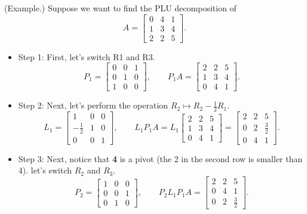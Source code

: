 \documentclass[letterpaper]{article}
\newcommand{\0}{\mathbf{0}}
\begin{document}
\begin{mdframed}
    (Example.) Suppose we want to find the PLU decomposition of 
    \[A = \begin{bmatrix}
        0 & 4 & 1 \\ 
        1 & 3 & 4 \\ 
        2 & 2 & 5
    \end{bmatrix}.\]

    \begin{itemize}
        \item Step 1: First, let's switch R1 and R3. 
        \[P_1 = \begin{bmatrix}
            0 & 0 & 1 \\ 
            0 & 1 & 0 \\ 
            1 & 0 & 0 
        \end{bmatrix}, \qquad P_1 A = \begin{bmatrix}
            2 & 2 & 5 \\ 
            1 & 3 & 4 \\ 
            0 & 4 & 1
        \end{bmatrix}.\]

        \item Step 2: Next, let's perform the operation $R_2 \mapsto R_2 - \frac{1}{2} R_1$.
        \[L_1 = \begin{bmatrix}
            1 & 0 & 0 \\ 
            -\frac{1}{2} & 1 & 0 \\ 
            0 & 0 & 1
        \end{bmatrix}, \qquad L_1 P_1 A = L_1 \begin{bmatrix}
            2 & 2 & 5 \\ 
            1 & 3 & 4 \\ 
            0 & 4 & 1
        \end{bmatrix} = \begin{bmatrix}
            2 & 2 & 5 \\ 
            0 & 2 & \frac{3}{2} \\ 
            0 & 4 & 1
        \end{bmatrix}.\]

        \item Step 3: Next, notice that \textbf{4} is a pivot (the 2 in the second row is smaller than 4). let's switch $R_2$ and $R_3$.
        \[P_2 = \begin{bmatrix}
            1 & 0 & 0 \\ 
            0 & 0 & 1 \\ 
            0 & 1 & 0
        \end{bmatrix}, \qquad P_2 L_1 P_1 A = \begin{bmatrix}
            2 & 2 & 5 \\ 
            0 & 4 & 1 \\ 
            0 & 2 & \frac{3}{2}
        \end{bmatrix}.\]


\end{itemize}
\end{mdframed}
\end{document}
